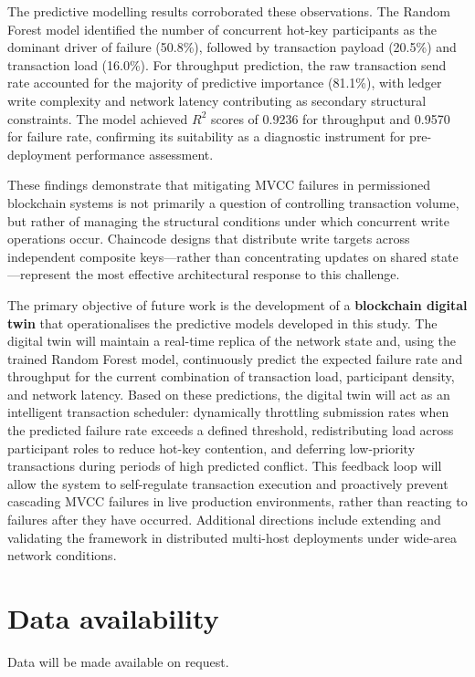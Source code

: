 ﻿\documentclass[12pt]{article}
\begin{document}
The predictive modelling results corroborated these observations. The Random Forest model identified the number of concurrent hot-key participants as the dominant driver of failure (50.8\%), followed by transaction payload (20.5\%) and transaction load (16.0\%). For throughput prediction, the raw transaction send rate accounted for the majority of predictive importance (81.1\%), with ledger write complexity and network latency contributing as secondary structural constraints. The model achieved $R^2$ scores of 0.9236 for throughput and 0.9570 for failure rate, confirming its suitability as a diagnostic instrument for pre-deployment performance assessment.

These findings demonstrate that mitigating MVCC failures in permissioned blockchain systems is not primarily a question of controlling transaction volume, but rather of managing the structural conditions under which concurrent write operations occur. Chaincode designs that distribute write targets across independent composite keys---rather than concentrating updates on shared state---represent the most effective architectural response to this challenge.

The primary objective of future work is the development of a \textbf{blockchain digital twin} that operationalises the predictive models developed in this study. The digital twin will maintain a real-time replica of the network state and, using the trained Random Forest model, continuously predict the expected failure rate and throughput for the current combination of transaction load, participant density, and network latency. Based on these predictions, the digital twin will act as an intelligent transaction scheduler: dynamically throttling submission rates when the predicted failure rate exceeds a defined threshold, redistributing load across participant roles to reduce hot-key contention, and deferring low-priority transactions during periods of high predicted conflict. This feedback loop will allow the system to self-regulate transaction execution and proactively prevent cascading MVCC failures in live production environments, rather than reacting to failures after they have occurred. Additional directions include extending and validating the framework in distributed multi-host deployments under wide-area network conditions.
\section*{Data availability}
	Data will be made available on request.
	
\end{document}
